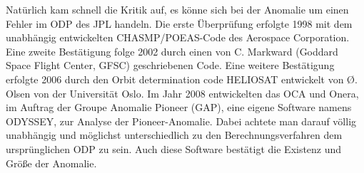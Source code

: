Natürlich kam schnell die Kritik auf, es könne sich bei der Anomalie um einen Fehler im ODP des JPL handeln.
Die erste Überprüfung erfolgte 1998 mit dem unabhängig entwickelten CHASMP/POEAS-Code des Aerospace Corporation.
Eine zweite Bestätigung folge 2002 durch einen von C. Markward (Goddard Space Flight Center, GFSC) geschriebenen
Code.
Eine weitere Bestätigung erfolgte 2006 durch den Orbit determination code HELIOSAT entwickelt von Ø. Olsen von der
Universität Oslo.
Im Jahr 2008 entwickelten das OCA und Onera, im Auftrag der Groupe Anomalie Pioneer (GAP),
eine eigene Software namens ODYSSEY, zur Analyse der Pioneer-Anomalie.
Dabei achtete man darauf völlig unabhängig und möglichst unterschiedlich zu den Berechnungsverfahren dem ursprünglichen ODP zu sein. 
Auch diese Software bestätigt die Existenz und Größe der Anomalie.\cite{Levy2008}


